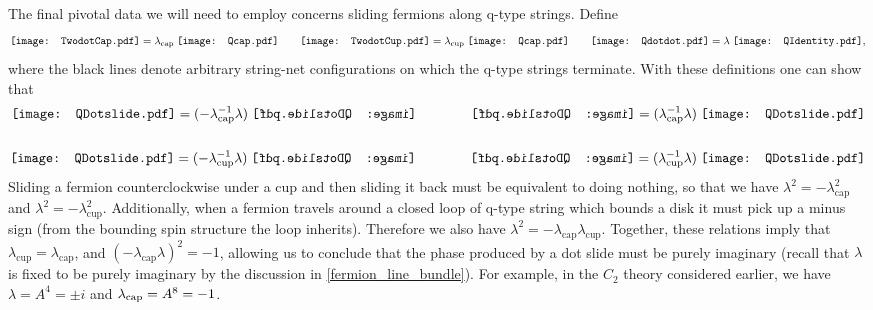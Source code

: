 \documentclass[12pt,a4paper]{article}
\newcommand{\zz}{\mathbb{Z}}
\newcommand{\kw}[1]{{\color{kwcolor}\footnotesize{(KW) #1}}}
\newcommand{\dave}[1]{{\color{ao(english)}\footnotesize{(DA) #1}}}
\newcommand{\ethan}[1]{{\color{amethyst}\footnotesize{(EL) #1}}}
\newcommand{\Qcap}{\mathord{\vcenter{\hbox{\texttt{[image: Qcap.pdf]}}}}}
\newcommand{\Qcup}{\mathord{\vcenter{\hbox{\texttt{[image: Qcap.pdf]}}}}}
\newcommand{\Qdotdot}{\mathord{\vcenter{\hbox{\texttt{[image: Qdotdot.pdf]}}}}}
\newcommand{\QIdentity}{\mathord{\vcenter{\hbox{\texttt{[image: QIdentity.pdf]}}}}}
\newcommand{\QCapDotL}{\mathord{\vcenter{\hbox{\texttt{[image: QDotslide.pdf]}}}}}
\newcommand{\QCupDotR}{\mathord{\vcenter{\hbox{\texttt{[image: QDotslide.pdf]}}}}}
\newcommand{\QCapDotR}{\mathord{\vcenter{\hbox{\reflectbox{\texttt{[image: QDotslide.pdf]}}}}}}
\newcommand{\QCupDotL}{\mathord{\vcenter{\hbox{\reflectbox{\texttt{[image: QDotslide.pdf]}}}}}}
\newcommand{\TwodotCap}{\mathord{\vcenter{\hbox{\texttt{[image: TwodotCap.pdf]}}}}}
\newcommand{\TwodotCup}{\mathord{\vcenter{\hbox{\texttt{[image: TwodotCup.pdf]}}}}}
\begin{document}
The final pivotal data we will need to employ concerns sliding fermions along q-type strings. 
Define 
\begin{align}
\TwodotCap =  \lambda_{\text{cap}} \; \Qcap \quad \quad
\TwodotCup =  \lambda_{\text{cup}}\; \Qcup \quad \quad
\Qdotdot =  \lambda \; \QIdentity,
\end{align}
where the black lines denote arbitrary string-net configurations on which the q-type strings terminate.
With these definitions one can show that
\begin{align}
\QCapDotL =(-\lambda_{\text{cap}}^{-1} \lambda )\; \QCapDotR \qquad \qquad \QCapDotR  = (\lambda_{\text{cap}}^{-1} \lambda ) \; \QCapDotL\\ 
\\
\QCupDotR= (-\lambda_{\text{cup}}^{-1} \lambda )\; \QCupDotL \qquad \qquad \QCupDotL  = (\lambda_{\text{cup}}^{-1} \lambda) \; \QCupDotR
\end{align}
Sliding a fermion counterclockwise under a cup and then sliding it back must be equivalent to doing nothing, so that we have $\lambda^2 = -\lambda_{\text{cap}}^2$ and $\lambda^2 = -\lambda_{\text{cup}}^2$.
Additionally, when a fermion travels around a closed loop of q-type string which bounds a disk it must pick up a minus sign (from the bounding spin structure the loop inherits). 
Therefore we also have $\lambda^2 = -\lambda_{\text{cap}} \lambda_{\text{cup}}$.
Together, these relations imply that $\lambda_{\text{cup}} = \lambda_{\text{cap}}$, and $(-\lambda_{\text{cap}} \lambda)^2 = -1$, allowing us to  
conclude that the phase produced by a dot slide must be purely imaginary (recall that 
$\lambda$ is fixed to be purely imaginary by the discussion in \ref{fermion_line_bundle}). 
For example, in the $C_2$ theory considered earlier, we have $\lambda = A^4 = \pm i$ and $\lambda_{\rm cap}=A^8=-1$. 
\end{document}
